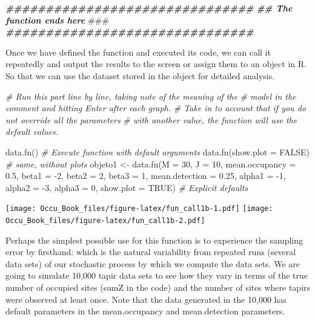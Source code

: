 \documentclass[
]{book}
\newenvironment{Shaded}{\begin{snugshade}}{\end{snugshade}}
\newcommand{\AlertTok}[1]{\textcolor[rgb]{0.94,0.16,0.16}{#1}}
\newcommand{\AttributeTok}[1]{\textcolor[rgb]{0.77,0.63,0.00}{#1}}
\newcommand{\CommentTok}[1]{\textcolor[rgb]{0.56,0.35,0.01}{\textit{#1}}}
\newcommand{\ConstantTok}[1]{\textcolor[rgb]{0.00,0.00,0.00}{#1}}
\newcommand{\DecValTok}[1]{\textcolor[rgb]{0.00,0.00,0.81}{#1}}
\newcommand{\DocumentationTok}[1]{\textcolor[rgb]{0.56,0.35,0.01}{\textbf{\textit{#1}}}}
\newcommand{\FloatTok}[1]{\textcolor[rgb]{0.00,0.00,0.81}{#1}}
\newcommand{\FunctionTok}[1]{\textcolor[rgb]{0.00,0.00,0.00}{#1}}
\newcommand{\NormalTok}[1]{#1}
\newcommand{\OtherTok}[1]{\textcolor[rgb]{0.56,0.35,0.01}{#1}}
\newcommand{\SpecialCharTok}[1]{\textcolor[rgb]{0.00,0.00,0.00}{#1}}
\begin{document}
\begin{Shaded}
\begin{Highlighting}[]
\DocumentationTok{\#\#\#\#\#\#\#\#\#\#\#\#\#\#\#\#\#\#\#\#\#\#\#\#\#\#\#\#\#\#\#}
\DocumentationTok{\#\# The function ends  here  }\AlertTok{\#\#\#}
\DocumentationTok{\#\#\#\#\#\#\#\#\#\#\#\#\#\#\#\#\#\#\#\#\#\#\#\#\#\#\#\#\#\#\#}
\end{Highlighting}
\end{Shaded}

Once we have defined the function and executed its code, we can call it repeatedly and output the results to the screen or assign them to an object in R. So that we can use the dataset stored in the object for detailed analysis.

\begin{Shaded}
\begin{Highlighting}[]
\CommentTok{\# Run this part line by line, taking note of the meaning of the }
\CommentTok{\# model in the comment and hitting Enter after each graph.}
\CommentTok{\# Take in to account that if you do not override all the parameters}
\CommentTok{\# with another value, the function will use the default values.}

\FunctionTok{data.fn}\NormalTok{()                  }\CommentTok{\# Execute function with default arguments}
\FunctionTok{data.fn}\NormalTok{(}\AttributeTok{show.plot =} \ConstantTok{FALSE}\NormalTok{) }\CommentTok{\# same, without plots}
\NormalTok{objeto1 }\OtherTok{\textless{}{-}} \FunctionTok{data.fn}\NormalTok{(}\AttributeTok{M =} \DecValTok{30}\NormalTok{, }\AttributeTok{J =} \DecValTok{10}\NormalTok{, }\AttributeTok{mean.occupancy =} \FloatTok{0.5}\NormalTok{, }
                   \AttributeTok{beta1 =} \SpecialCharTok{{-}}\DecValTok{2}\NormalTok{, }\AttributeTok{beta2 =} \DecValTok{2}\NormalTok{, }\AttributeTok{beta3 =} \DecValTok{1}\NormalTok{, }
                   \AttributeTok{mean.detection =} \FloatTok{0.25}\NormalTok{, }\AttributeTok{alpha1 =} \SpecialCharTok{{-}}\DecValTok{1}\NormalTok{,}
                   \AttributeTok{alpha2 =} \SpecialCharTok{{-}}\DecValTok{3}\NormalTok{, }\AttributeTok{alpha3 =} \DecValTok{0}\NormalTok{, }\AttributeTok{show.plot =} \ConstantTok{TRUE}\NormalTok{) }\CommentTok{\# Explicit defaults}
\end{Highlighting}
\end{Shaded}

\texttt{[image: Occu\_Book\_files/figure-latex/fun\_call1b-1.pdf]} \texttt{[image: Occu\_Book\_files/figure-latex/fun\_call1b-2.pdf]}

Perhaps the simplest possible use for this function is to experience the sampling error by firsthand: which is the natural variability from repeated runs (several data sets) of our stochastic process by which we compute the data sets. We are going to simulate 10,000 tapir data sets to see how they vary in terms of the true number of occupied sites (sumZ in the code) and the number of sites where tapirs were observed at least once. Note that the data generated in the 10,000 has default parameters in the mean.occupancy and mean.detection parameters.
\end{document}
